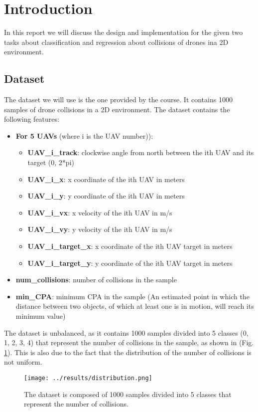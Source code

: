 \section{Introduction}
In this report we will discuss the design and implementation for the given two tasks about classification and regression about collisions of drones ina  2D environment.

\subsection{Dataset}
The dataset we will use is the one provided by the course. It contains 1000 samples of drone collisions in a 2D environment. The dataset contains the following features:
\begin{itemize}
    \item \textbf{For 5 UAVs} (where i is the UAV number)):
    \begin{itemize}
        \item \textbf{UAV\_i\_track}: clockwise angle from north between the ith UAV and its target (0, 2*pi)
        \item \textbf{UAV\_i\_x}: x coordinate of the ith UAV in meters
        \item \textbf{UAV\_i\_y}: y coordinate of the ith UAV in meters
        \item \textbf{UAV\_i\_vx}: x velocity of the ith UAV in m/s
        \item \textbf{UAV\_i\_vy}: y velocity of the ith UAV in m/s
        \item \textbf{UAV\_i\_target\_x}: x coordinate of the ith UAV target in meters
        \item \textbf{UAV\_i\_target\_y}: y coordinate of the ith UAV target in meters
    \end{itemize}
    \item \textbf{num\_collisions}: number of collisions in the sample
    \item \textbf{min\_CPA}: minimum CPA in the sample (An estimated point in which the distance between two objects, of which at least one is in motion, will reach its minimum value)
\end{itemize}
The dataset is unbalanced, as it contains 1000 samples divided into 5 classes (0, 1, 2, 3, 4) that represent the number of collisions in the sample, as shown in (Fig. \ref{fig:dataset_distribution}).
This is also due to the fact that the distribution of the number of collisions is not uniform.

\begin{figure}
    \centering
    \texttt{[image: ../results/distribution.png]}
    \caption{The dataset is composed of 1000 samples divided into 5 classes that represent the number of collisions.}
    \label{fig:dataset_distribution}
\end{figure}


